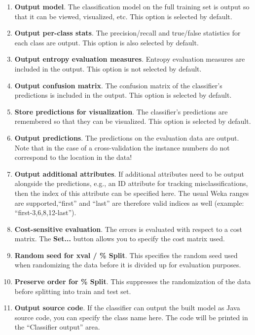 \begin{enumerate}
\item \textbf{Output model}.
The classification model on the full training set is output so that it can be
viewed, visualized, etc. This option is selected by default.
\item \textbf{Output per-class stats}.  The precision/recall and
true/false statistics for each class are output. This option is also
selected by default.
\item \textbf{Output entropy evaluation measures}.  Entropy evaluation
measures are included in the output. This option is not selected by
default.
\item \textbf{Output confusion matrix}.
The confusion matrix of the classifier's predictions is included in the output.
This option is selected by default.
\item \textbf{Store predictions for visualization}.  The classifier's
predictions are remembered so that they can be visualized. This option
is selected by default.
\item \textbf{Output predictions}. The predictions on the evaluation
data are output.  Note that in the case of a cross-validation the
instance numbers do not correspond to the location in the data!
\item \textbf{Output additional attributes}. If additional attributes need to
be output alongside the predictions, e.g., an ID attribute for tracking
misclassifications, then the index of this attribute can be specified here. The
usual Weka ranges are supported,``first'' and ``last'' are therefore valid
indices as well (example: ``first-3,6,8,12-last'').
\item \textbf{Cost-sensitive evaluation}.
The errors is evaluated with respect to a cost matrix. The \textbf{Set...}
button allows you to specify the cost matrix used. 
\item \textbf{Random seed for xval / \% Split}.
This specifies the random seed used when randomizing the data before it is
divided up for evaluation purposes.
\item \textbf{Preserve order for \% Split}.
This suppresses the randomization of the data before splitting into train
and test set.
\item \textbf{Output source code}.
If the classifier can output the built model as Java source code, you can 
specify the class name here. The code will be printed in the ``Classifier 
output'' area.
\end{enumerate}

